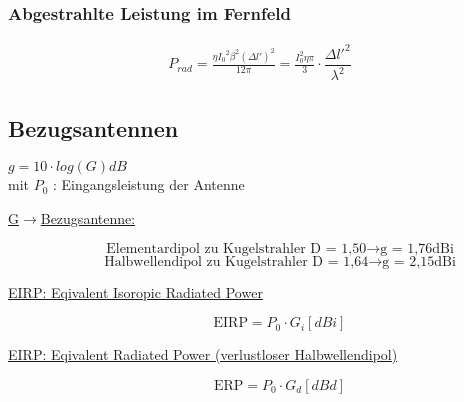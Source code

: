 \subsubsection{Abgestrahlte Leistung im Fernfeld}
\begin{align*}
    P_{rad} = \frac{\eta {I_0}^2 \beta^2 (\Delta l')^2}{12\pi} = \frac{I_0^2\eta\pi}{3}\cdot \dfrac{\Delta l'^2}{\lambda^2}
\end{align*}
\subsection{Bezugsantennen}
$ \boxed{g = 10 \cdot log(G)dB}$ \\
mit $P_0$ : Eingangsleistung der Antenne
\begin{description}
    \item [\underline{G$\rightarrow$Bezugsantenne:}]
          \[
              \text{Elementardipol  zu Kugelstrahler D = 1,50} \rightarrow \text{g = 1,76dBi}
          \]
          \[
              \text{Halbwellendipol zu Kugelstrahler D = 1,64} \rightarrow \text{g = 2,15dBi}
          \]
    \item[\underline{EIRP: Eqivalent \underline{Isoropic} Radiated Power}]
          \[
              \text{EIRP} = P_0 \cdot G_i [dBi]
          \]
    \item[\underline{EIRP: Eqivalent Radiated Power (verlustloser Halbwellendipol)}]
          \[
              \text{ERP} = P_0 \cdot G_d [dBd]
          \]
\end{description}